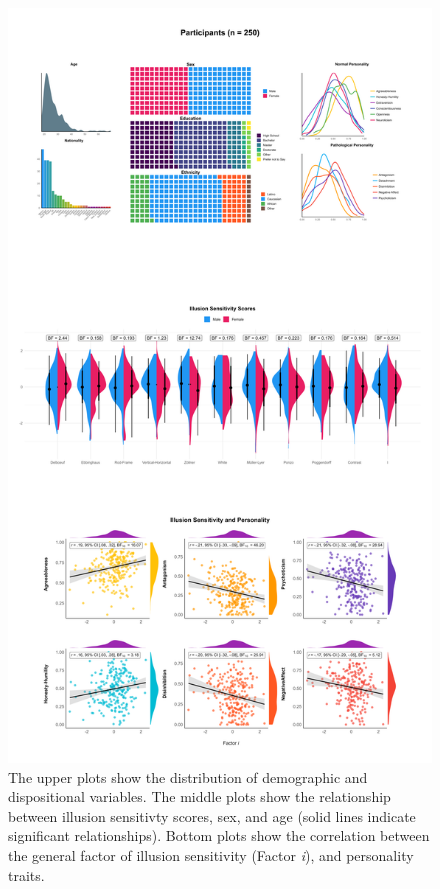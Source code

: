 \documentclass[
  man,floatsintext]{apa6}
\begin{document}
\begin{figure}
\includegraphics[width=1\linewidth]{figures/Figure3} \caption{The upper plots show the distribution of demographic and dispositional variables. The middle plots show the relationship between illusion sensitivty scores, sex, and age (solid lines indicate significant relationships). Bottom plots show the correlation between the general factor of illusion sensitivity (Factor \textit{i}), and personality traits.}\label{fig:unnamed-chunk-4}
\end{figure}
\end{document}
